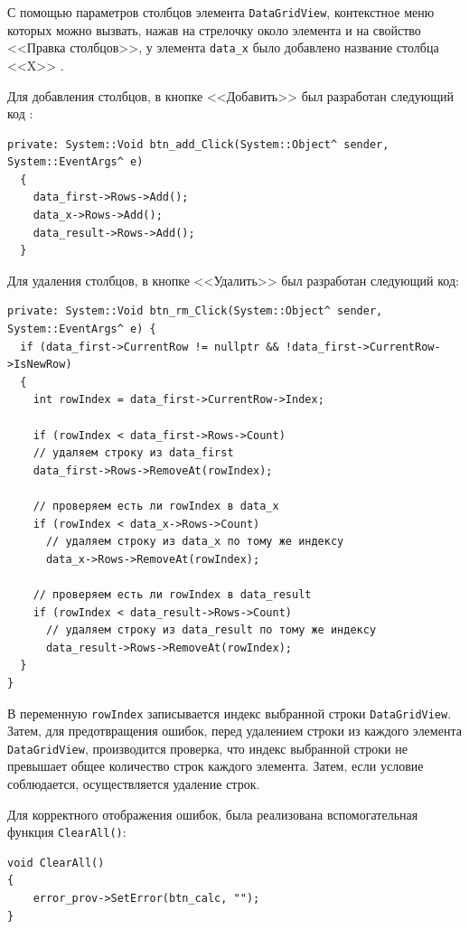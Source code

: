 С помощью параметров столбцов элемента \verb|DataGridView|, контекстное меню которых можно 
вызвать, нажав на стрелочку около элемента и на свойство <<Правка столбцов>>, у элемента 
\verb|data_x| было добавлено название столбца <<X>> \cite{book_msvisual}.

Для добавления столбцов, в кнопке <<Добавить>> был разработан следующий код \cite{book_tmp}:
\begin{verbatim}
private: System::Void btn_add_Click(System::Object^ sender, System::EventArgs^ e) 
  {
    data_first->Rows->Add();
    data_x->Rows->Add();
    data_result->Rows->Add();
  }
\end{verbatim}

Для удаления столбцов, в кнопке <<Удалить>> был разработан следующий код:
\begin{verbatim}
private: System::Void btn_rm_Click(System::Object^ sender, System::EventArgs^ e) {
  if (data_first->CurrentRow != nullptr && !data_first->CurrentRow->IsNewRow)
  {
    int rowIndex = data_first->CurrentRow->Index;

    if (rowIndex < data_first->Rows->Count)
    // удаляем строку из data_first
    data_first->Rows->RemoveAt(rowIndex);

    // проверяем есть ли rowIndex в data_x
    if (rowIndex < data_x->Rows->Count)
      // удаляем строку из data_x по тому же индексу
      data_x->Rows->RemoveAt(rowIndex);

    // проверяем есть ли rowIndex в data_result
    if (rowIndex < data_result->Rows->Count)
      // удаляем строку из data_result по тому же индексу
      data_result->Rows->RemoveAt(rowIndex);
  }
}
\end{verbatim}
В переменную \verb|rowIndex| записывается индекс выбранной строки \verb|DataGridView|.
Затем, для предотвращения ошибок, перед удалением строки из каждого элемента \verb|DataGridView|,
производится проверка, что индекс выбранной строки не превышает общее количество строк каждого элемента.
Затем, если условие соблюдается, осуществляется удаление строк.

Для корректного отображения ошибок, была реализована вспомогательная функция \verb|ClearAll()|:
\begin{verbatim}
void ClearAll()
{
    error_prov->SetError(btn_calc, "");
}
\end{verbatim}

